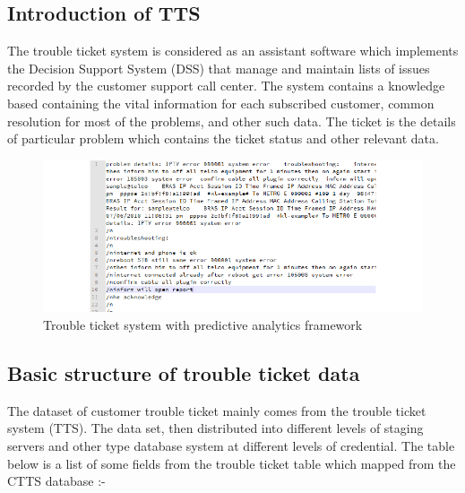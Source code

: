 \documentclass[]{article}
\begin{document}
\subsection{Introduction of TTS}\label{introduction-of-tts}

The trouble ticket system is considered as an assistant software which
implements the Decision Support System (DSS) that manage and maintain
lists of issues recorded by the customer support call center. The system
contains a knowledge based containing the vital information for each
subscribed customer, common resolution for most of the problems, and
other such data. The ticket is the details of particular problem which
contains the ticket status and other relevant data.

\begin{figure}[htbp]
\centering
\includegraphics{Journal1_files/figure-latex/unnamed-chunk-4-1.pdf}
\caption{Trouble ticket system with predictive analytics framework}
\end{figure}

\subsection{Basic structure of trouble ticket
data}\label{basic-structure-of-trouble-ticket-data}

The dataset of customer trouble ticket mainly comes from the trouble
ticket system (TTS). The data set, then distributed into different
levels of staging servers and other type database system at different
levels of credential. The table below is a list of some fields from the
trouble ticket table which mapped from the CTTS database :-
\end{document}
